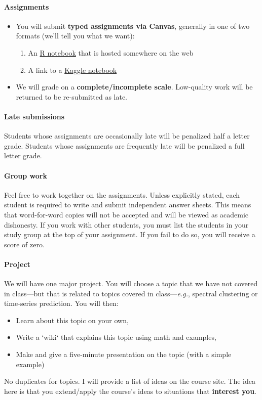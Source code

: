 \documentclass[10pt]{article}
\newcommand{\emf}[1]{\textbf{\textcolor{grass_green}{#1}}}
\begin{document}
\paragraph{Assignments}
\begin{itemize}
  \item You will submit \emf{typed assignments via Canvas}, generally in one of two formats (we'll tell you what we want):
  \begin{enumerate}
    \item An \href{https://www.rstudio.com/blog/r-notebooks/}{R notebook} that is hosted somewhere on the web
    \item A link to a \href{https://www.kaggle.com/docs/notebooks}{Kaggle notebook}
  \end{enumerate}
  \item We will grade on a \emf{complete/incomplete scale}. \newline Low-quality work will be returned to be re-submitted as late.
\end{itemize}

\paragraph{Late submissions} Students whose assignments are occasionally late will be penalized half a letter grade. Students whose assignments are frequently late will be penalized a full letter grade.

\paragraph{Group work} Feel free to work together on the assignments. Unless explicitly stated, each student is required to write and submit independent answer sheets. This means that word-for-word copies will not be accepted and will be viewed as academic dishonesty. If you work with other students, you must list the students in your study group at the top of your assignment. If you fail to do so, you will receive a score of zero.

\paragraph{Project} We will have one major project. You will choose a topic that we have not covered in class---but that is related to topics covered in class---\textit{e.g.}, spectral clustering or time-series prediction. You will then:
\begin{itemize}
  \item Learn about this topic on your own,
  \item Write a `wiki` that explains this topic using math and examples,
  \item Make and give a five-minute presentation on the topic (with a simple example)
\end{itemize}
No duplicates for topics. I will provide a list of ideas on the course site. The idea here is that you extend/apply the course's ideas to situations that \textbf{interest you}.
\end{document}
